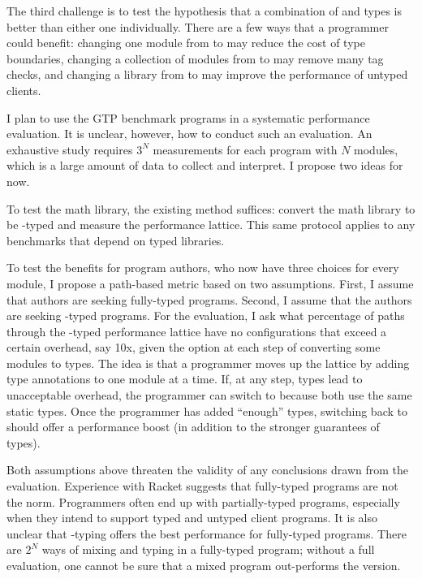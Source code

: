 The third challenge is to test the hypothesis that a combination of \tdeep{}
 and \tshallow{} types is better than either one individually.
There are a few ways that a programmer could benefit:
 changing one module from \tdeep{} to \tshallow{} may reduce the cost of type boundaries,
 changing a collection of modules from \tshallow{} to \tdeep{} may remove many tag checks,
 and changing a library from \tdeep{} to \tshallow{} may improve the performance of untyped clients.

I plan to use the GTP benchmark programs in a systematic performance evaluation.
It is unclear, however, how to conduct such an evaluation.
An exhaustive study requires $3^N$ measurements for each program with $N$
 modules, which is a large amount of data to collect and interpret.
I propose two ideas for now.

To test the math library, the existing method suffices:
 convert the math library to be \tshallow{}-typed and measure the performance lattice.
This same protocol applies to any benchmarks that depend on typed libraries.

To test the benefits for program authors, who now have three choices for every
module, I propose a path-based metric based on two assumptions.
First, I assume that authors are seeking fully-typed programs.
Second, I assume that the authors are seeking \tdeep{}-typed programs.
For the evaluation, I ask what percentage of paths through the \tdeep{}-typed performance
 lattice have no configurations that exceed a certain overhead, say 10x, given
 the option at each step of converting some modules to \tshallow{} types.
The idea is that a programmer moves up the lattice by adding type annotations
 to one module at a time.
If, at any step, \tdeep{} types lead to unacceptable overhead, the programmer can
 switch to \tshallow{} because both use the same static types.
Once the programmer has added ``enough'' types, switching back to \tdeep{} should
offer a performance boost (in addition to the stronger guarantees of \tdeep{} types).

Both assumptions above threaten the validity of any conclusions drawn from the
evaluation.
Experience with Racket suggests that fully-typed programs are not the norm.
Programmers often end up with partially-typed programs, especially when they
intend to support typed and untyped client programs.
It is also unclear that \tdeep{}-typing offers the best performance for fully-typed
programs.
There are $2^N$ ways of mixing \tdeep{} and \tshallow{} typing in a fully-typed program;
 without a full evaluation, one cannot be sure that a mixed program out-performs
 the \tdeep{} version.

